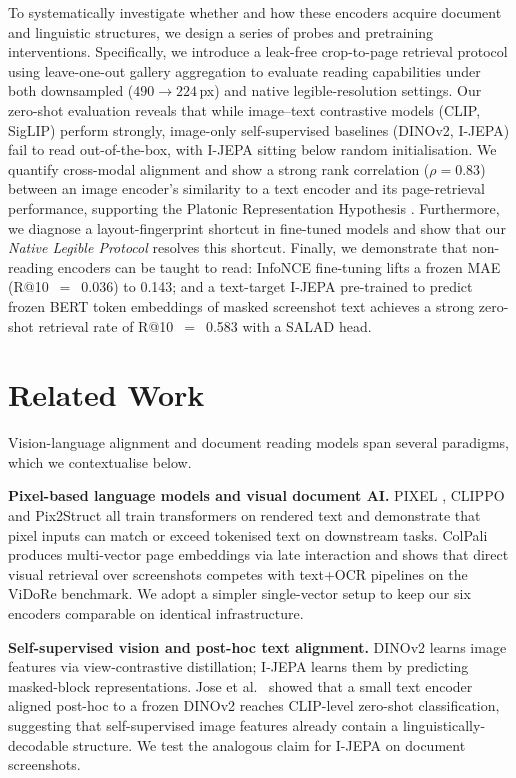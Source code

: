 \documentclass{article}
\begin{document}
To systematically investigate whether and how these encoders acquire document and linguistic structures, we design a series of probes and pretraining interventions. Specifically, we introduce a leak-free crop-to-page retrieval protocol using leave-one-out gallery aggregation to evaluate reading capabilities under both downsampled ($490{\to}224$\,px) and native legible-resolution settings. Our zero-shot evaluation reveals that while image--text contrastive models (CLIP, SigLIP) perform strongly, image-only self-supervised baselines (DINOv2, I-JEPA) fail to read out-of-the-box, with I-JEPA sitting below random initialisation. We quantify cross-modal alignment and show a strong rank correlation ($\rho = 0.83$) between an image encoder's similarity to a text encoder and its page-retrieval performance, supporting the Platonic Representation Hypothesis \cite{huh2024platonic}. Furthermore, we diagnose a layout-fingerprint shortcut in fine-tuned models and show that our \emph{Native Legible Protocol} resolves this shortcut. Finally, we demonstrate that non-reading encoders can be taught to read: InfoNCE fine-tuning lifts a frozen MAE (R@10~$=$~0.036) to 0.143; and a text-target I-JEPA pre-trained to predict frozen BERT token embeddings of masked screenshot text achieves a strong zero-shot retrieval rate of R@10~$=$~0.583 with a SALAD head.

\section{Related Work}
\label{sec:related}

Vision-language alignment and document reading models span several
paradigms, which we contextualise below.

\textbf{Pixel-based language models and visual document AI.}
PIXEL \cite{rust2023pixel}, CLIPPO \cite{tschannen2023clippo} and
Pix2Struct \cite{lee2023pix2struct} all train transformers on
rendered text and demonstrate that pixel inputs can match or exceed
tokenised text on downstream tasks. ColPali
\cite{faysse2025colpali} produces multi-vector page embeddings via
late interaction and shows that direct visual retrieval over
screenshots competes with text+OCR pipelines on the ViDoRe
benchmark. We adopt a simpler single-vector setup to keep our six
encoders comparable on identical infrastructure.

\textbf{Self-supervised vision and post-hoc text alignment.}
DINOv2 \cite{oquab2024dinov2} learns image features via
view-contrastive distillation; I-JEPA \cite{assran2023ijepa} learns
them by predicting masked-block representations. Jose et al.\
\cite{jose2024dinov2text} showed that a small text encoder aligned
post-hoc to a frozen DINOv2 reaches CLIP-level zero-shot
classification, suggesting that self-supervised image features
already contain a linguistically-decodable structure. We test the
analogous claim for I-JEPA on document screenshots.
\end{document}
